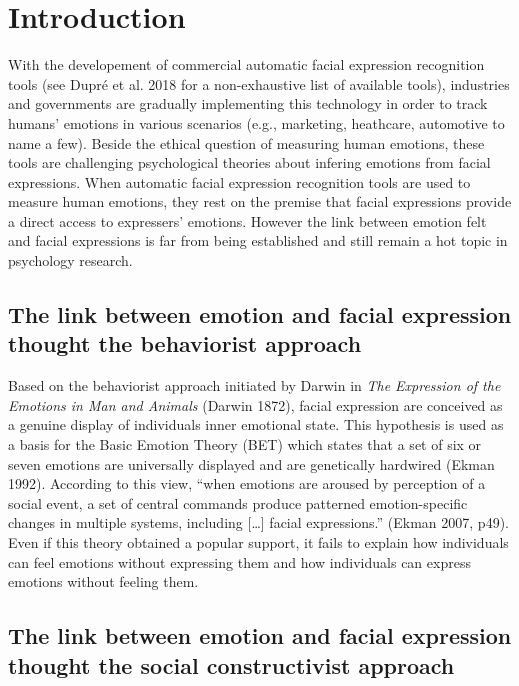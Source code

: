 \documentclass[conference,final,]{IEEEtran}
\begin{document}
\hypertarget{introduction}{%
\section{Introduction}\label{introduction}}

With the developement of commercial automatic facial expression
recognition tools (see Dupré et al. 2018 for a non-exhaustive list of
available tools), industries and governments are gradually implementing
this technology in order to track humans' emotions in various scenarios
(e.g., marketing, heathcare, automotive to name a few). Beside the
ethical question of measuring human emotions, these tools are
challenging psychological theories about infering emotions from facial
expressions. When automatic facial expression recognition tools are used
to measure human emotions, they rest on the premise that facial
expressions provide a direct access to expressers' emotions. However the
link between emotion felt and facial expressions is far from being
established and still remain a hot topic in psychology research.

\hypertarget{the-link-between-emotion-and-facial-expression-thought-the-behaviorist-approach}{%
\subsection{The link between emotion and facial expression thought the
behaviorist
approach}\label{the-link-between-emotion-and-facial-expression-thought-the-behaviorist-approach}}

Based on the behaviorist approach initiated by Darwin in \emph{The
Expression of the Emotions in Man and Animals} (Darwin 1872), facial
expression are conceived as a genuine display of individuals inner
emotional state. This hypothesis is used as a basis for the Basic
Emotion Theory (BET) which states that a set of six or seven emotions
are universally displayed and are genetically hardwired (Ekman 1992).
According to this view, ``when emotions are aroused by perception of a
social event, a set of central commands produce patterned
emotion-specific changes in multiple systems, including {[}\ldots{}{]}
facial expressions.'' (Ekman 2007, p49). Even if this theory obtained a
popular support, it fails to explain how individuals can feel emotions
without expressing them and how individuals can express emotions without
feeling them.

\hypertarget{the-link-between-emotion-and-facial-expression-thought-the-social-constructivist-approach}{%
\subsection{The link between emotion and facial expression thought the
social constructivist
approach}\label{the-link-between-emotion-and-facial-expression-thought-the-social-constructivist-approach}}
\end{document}
